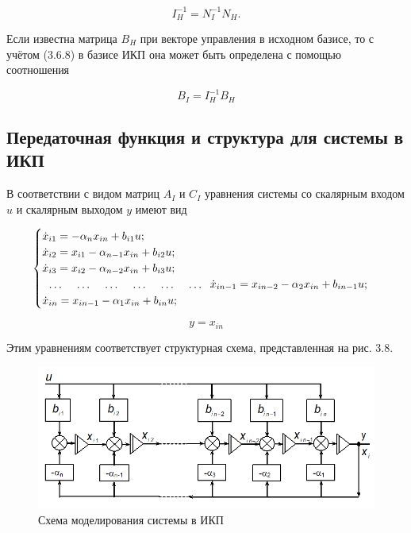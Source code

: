 \begin{equation}
	I_H^{-1}=N_I^{-1}N_H.
\end{equation}

Если известна матрица $B_H$ при векторе управления в исходном базисе, то с учётом (3.6.8)  в базисе ИКП она может быть определена с помощью соотношения

\begin{equation}
	B_I=I_H^{-1}B_H
\end{equation}

\subsection{Передаточная функция и структура для системы в ИКП}
В соответствии с видом матриц $A_I$ и $C_I$ уравнения системы со скалярным входом $u$ и скалярным выходом $y$  имеют вид

\begin{equation}
\begin{cases}
	\dot{x}_{i1} = -\alpha_nx_{in}+b_{i1}u;\\
	\dot{x}_{i2} = x_{i1} - \alpha_{n-1}x_{in}+b_{i2}u;\\
	\dot{x}_{i3} = x_{i2} - \alpha_{n-2}x_{in}+b_{i3}u;\\
	\begin{tabular}{ l l l l l l }
	  \dots & \dots & \dots & \dots & \dots & \dots 
	\end{tabular}
	\dot{x}_{in-1} = x_{in-2} - \alpha_{2}x_{in}+b_{in-1}u;\\
	\dot{x}_{in} = x_{in-1} - \alpha_{1}x_{in}+b_{in}u;\\
\end{cases}
\end{equation}

\begin{equation}
	y = x_{in}
\end{equation}

Этим уравнениям соответствует структурная схема, представленная на рис. 3.8.

\begin{figure}[H]
	\centering
	\includegraphics[scale=0.9]{images/Fig3_8}
	\caption{Схема моделирования системы в ИКП}
\end{figure}

